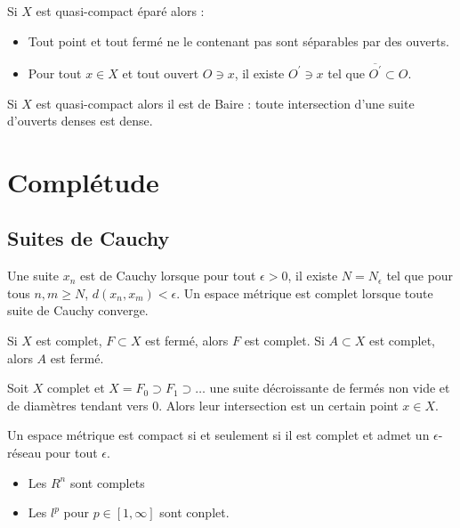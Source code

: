 \documentclass{cours}
\begin{document}
\begin{lemma}
    Si $X$ est quasi-compact éparé alors : 
    \begin{itemize}
        \item Tout point et tout fermé ne le contenant pas sont séparables par des ouverts.
        \item Pour tout $x \in X$ et tout ouvert $O \owns x$, il existe $O^{'} \owns x$ tel que $\overline{O^{'}} \subset O$.
    \end{itemize}
\end{lemma}

\begin{theorem}\label{thm:Bairemétrique}
    Si $X$ est quasi-compact alors il est de Baire : toute intersection d'une suite d'ouverts denses est dense.    
\end{theorem}

\section{Complétude}
\subsection{Suites de Cauchy}
\begin{definition}
    Une suite $x_{n}$ est de Cauchy lorsque pour tout $\epsilon > 0$, il existe $N = N_{\epsilon}$ tel que pour tous $n, m \geq N$, $d(x_{n}, x_{m}) < \epsilon$. Un espace métrique est complet lorsque toute suite de Cauchy converge.
\end{definition}

\begin{lemma}
    Si $X$ est complet, $F \subset X$ est fermé, alors $F$ est complet. Si $A \subset X$ est complet, alors $A$ est fermé.
\end{lemma}

\begin{lemma}
    Soit $X$ complet et $X = F_{0} \supset F_{1} \supset \dots$ une suite décroissante de fermés non vide et de diamètres tendant vers $0$. Alors leur intersection est un certain point $x \in X$.
\end{lemma}

\begin{theorem}
    Un espace métrique est compact si et seulement si il est complet et admet un $\epsilon$-réseau pour tout $\epsilon$.
\end{theorem}

\begin{theorem}
    \begin{itemize}
        \item Les $R^{n}$ sont complets
        \item Les $l^{p}$ pour $p \in \left[1, \infty\right]$ sont conplet.
    \end{itemize}
\end{theorem}
\end{document}
